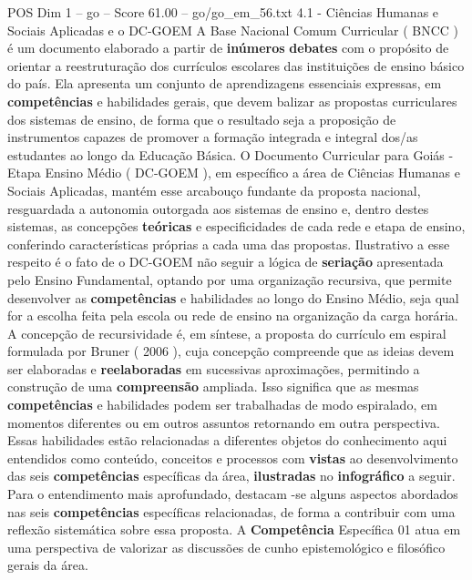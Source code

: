 \begin{textsample}{POS Dim 1 – go – Score 61.00 – go/go\_em\_56.txt}  \label{ex:f1_pos_092}
4.1 - Ciências Humanas e Sociais Aplicadas e o DC-GOEM A Base Nacional Comum Curricular ( BNCC ) é um documento elaborado a partir de \textbf{inúmeros} \textbf{debates} com o propósito de orientar a reestruturação dos currículos escolares das instituições de ensino básico do país.
Ela apresenta um conjunto de aprendizagens essenciais expressas, em \textbf{competências} e habilidades gerais, que devem balizar as propostas curriculares dos sistemas de ensino, de forma que o resultado seja a proposição de instrumentos capazes de promover a formação integrada e integral dos/as estudantes ao longo da Educação Básica.
O Documento Curricular para Goiás - Etapa Ensino Médio ( DC-GOEM ), em específico a área de Ciências Humanas e Sociais Aplicadas, mantém esse arcabouço fundante da proposta nacional, resguardada a autonomia outorgada aos sistemas de ensino e, dentro destes sistemas, as concepções \textbf{teóricas} e especificidades de cada rede e etapa de ensino, conferindo características próprias a cada uma das propostas.
Ilustrativo a esse respeito é o fato de o DC-GOEM não seguir a lógica de \textbf{seriação} apresentada pelo Ensino Fundamental, optando por uma organização recursiva, que permite desenvolver as \textbf{competências} e habilidades ao longo do Ensino Médio, seja qual for a escolha feita pela escola ou rede de ensino na organização da carga horária.
A concepção de recursividade é, em síntese, a proposta do currículo em espiral formulada por Bruner ( 2006 ), cuja concepção compreende que as ideias devem ser elaboradas e \textbf{reelaboradas} em sucessivas aproximações, permitindo a construção de uma \textbf{compreensão} ampliada.
Isso significa que as mesmas \textbf{competências} e habilidades podem ser trabalhadas de modo espiralado, em momentos diferentes ou em outros assuntos retornando em outra perspectiva.
Essas habilidades estão relacionadas a diferentes objetos do conhecimento aqui entendidos como conteúdo, conceitos e processos com \textbf{vistas} ao desenvolvimento das seis \textbf{competências} específicas da área, \textbf{ilustradas} no \textbf{infográfico} a seguir.
Para o entendimento mais aprofundado, destacam -se alguns aspectos abordados nas seis \textbf{competências} específicas relacionadas, de forma a contribuir com uma reflexão sistemática sobre essa proposta.
A \textbf{Competência} Específica 01 atua em uma perspectiva de valorizar as discussões de cunho epistemológico e filosófico gerais da área.

\end{textsample}
